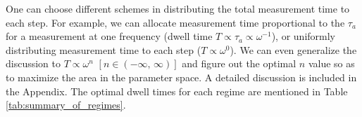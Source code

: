 \documentclass{WileyMSP-template}
\newcommand{\DK}[1]{\textcolor{brown}{Derek: #1}}
\newcommand{\AW}[1]{\textcolor{cyan}{Arne: #1}}
\begin{document}
	




	One can choose different schemes in distributing the total measurement time to each step. For example, we can allocate measurement time proportional to the $\tau_a$ for a measurement at one frequency (dwell time $T\propto\tau_a\propto\omega^{-1}$), or uniformly distributing measurement time to each step ($T\propto\omega^{0}$). We can even generalize the discussion to $T\propto\omega^{n}$ $[n\in(-\infty,\,\infty)]$ and figure out the optimal $n$ value so as to maximize the area in the parameter space. 
	A detailed discussion is included in the Appendix. The optimal dwell times for each regime are mentioned in Table \ref{tab:summary_of_regimes}. 

	
\end{document}
